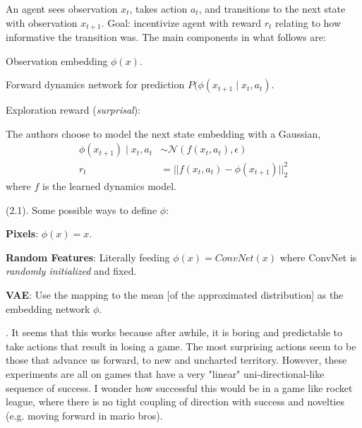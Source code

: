 \documentclass[11pt]{article}
\newcommand\myspace[1][]{\vspace{#1\bigskipamount}}
\newcommand\p{\Needspace{10\baselineskip} \noindent}
\begin{document}
An agent sees observation $x_t$, takes action $a_t$, and transitions to the next state with observation $x_{t + 1}$. Goal: incentivize agent with reward $r_t$ relating to how informative the transition was. The main components in what follows are:
\begin{compactitem}
	\item Observation embedding $\phi(x)$. 
	\item Forward dynamics network for prediction $P(\phi(x_{t+1} \mid x_t, a_t)$. 
	\item Exploration reward (\textit{surprisal}):
\end{compactitem}
The authors choose to model the next state embedding with a Gaussian,
\begin{align}
	\phi(x_{t+1}) \mid x_t, a_t
		&\sim \mathcal{N}(f(x_t, a_t), \epsilon ) \\
	r_t 
		&= ||f(x_t, a_t) - \phi(x_{t+1})||_2^2
\end{align}
where $f$ is the learned dynamics model. 

\myspace 
\p {} (2.1). Some possible ways to define $\phi$:
\begin{compactitem}
	\item \textbf{Pixels}: $\phi(x) = x$.
	
	\item \textbf{Random Features}: Literally feeding $\phi(x) = ConvNet(x)$ where ConvNet is \textit{randomly initialized} and fixed. 
	
	\item \textbf{VAE}: Use the mapping to the mean [of the approximated distribution] as the embedding network $\phi$. 
\end{compactitem}


\myspace
\p {}. It seems that this works because after awhile, it is boring and predictable to take actions that result in losing a game. The most surprising actions seem to be those that advance us forward, to new and uncharted territory. However, these experiments are all on games that have a very "linear" uni-directional-like sequence of success. I wonder how successful this would be in a game like rocket league, where there is no tight coupling of direction with success and novelties (e.g. moving forward in mario bros). 
\end{document}
